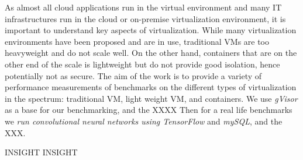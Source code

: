 \begin{abstract}
\end{abstract}
%
As almost all cloud applications run in the virtual environment and many IT infrastructures run in the cloud or on-premise virtualization environment, it is important to understand key aspects of virtualization.
%
While many virtualization environments have been proposed and are in use, traditional VMs are too heavyweight and do not scale well.
%
On the other hand, containers that are on the other end of the scale is lightweight but do not provide good isolation, hence potentially not as secure.
%
The aim of the work is to provide a variety of performance measurements of benchmarks on the different types of virtualization in the spectrum: traditional VM, light weight VM, and containers.
%
We use \emph{gVisor} as a base for our benchmarking, and the XXXX
%
Then for a real life benchmarks we \emph{run convolutional neural networks using TensorFlow} and \emph{mySQL}, and the XXX.
%

INSIGHT INSIGHT